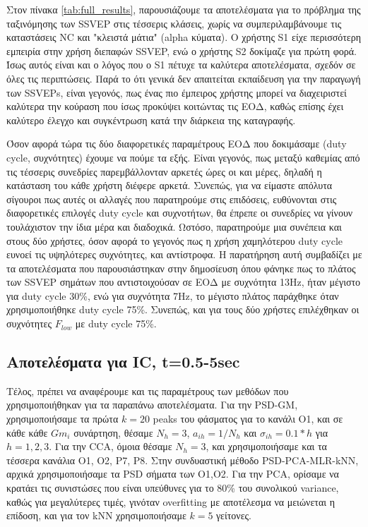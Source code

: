 \documentclass[11pt,a4paper,english,greek,twoside]{../Thesis}
\begin{document}
\par Στον πίνακα \ref{tab:full_results}, παρουσιάζουμε τα αποτελέσματα για το πρόβλημα της ταξινόμησης των SSVEP στις τέσσερις κλάσεις, χωρίς να συμπεριλαμβάνουμε τις καταστάσεις NC και "κλειστά μάτια" (alpha κύματα). Ο χρήστης S1 είχε περισσότερη εμπειρία στην χρήση διεπαφών SSVEP, ενώ ο χρήστης S2 δοκίμαζε για πρώτη φορά. Ίσως αυτός είναι και ο λόγος που ο S1 πέτυχε τα καλύτερα αποτελέσματα, σχεδόν σε όλες τις περιπτώσεις. Παρά το ότι γενικά δεν απαιτείται εκπαίδευση για την παραγωγή των SSVEPs, είναι γεγονός, πως ένας πιο έμπειρος χρήστης μπορεί να διαχειριστεί καλύτερα την κούραση που ίσως προκύψει κοιτώντας τις ΕΟΔ, καθώς επίσης έχει καλύτερο έλεγχο και συγκέντρωση κατά την διάρκεια της καταγραφής.
\par Όσον αφορά τώρα τις δύο διαφορετικές παραμέτρους ΕΟΔ που δοκιμάσαμε (duty cycle, συχνότητες) έχουμε να πούμε τα εξής. Είναι γεγονός, πως μεταξύ καθεμίας από τις τέσσερις συνεδρίες παρεμβάλλονταν αρκετές ώρες οι και μέρες, δηλαδή η κατάσταση του κάθε χρήστη διέφερε αρκετά. Συνεπώς, για να είμαστε απόλυτα σίγουροι πως αυτές οι αλλαγές που παρατηρούμε στις επιδόσεις, ευθύνονται στις διαφορετικές επιλογές duty cycle και συχνοτήτων, θα έπρεπε οι συνεδρίες να γίνουν τουλάχιστον την ίδια μέρα και διαδοχικά. Ωστόσο, παρατηρούμε μια συνέπεια και στους δύο χρήστες, όσον αφορά το γεγονός πως η χρήση χαμηλότερου duty cycle ευνοεί τις υψηλότερες συχνότητες, και αντίστροφα. Η παρατήρηση αυτή συμβαδίζει με τα αποτελέσματα που παρουσιάστηκαν στην δημοσίευση \cite{Huang2012-va} όπου φάνηκε πως το πλάτος των SSVEP σημάτων που αντιστοιχούσαν σε ΕΟΔ με συχνότητα 13Hz, ήταν μέγιστο για duty cycle 30\%, ενώ για συχνότητα 7Hz, το μέγιστο πλάτος παράχθηκε όταν χρησιμοποιήθηκε duty cycle 75\%. Συνεπώς, και για τους δύο χρήστες επιλέχθηκαν οι συχνότητες $F_{low}$ με duty cycle 75\%.
\subsection{Αποτελέσματα για IC,  t=0.5-5sec}
\par Τέλος, πρέπει να αναφέρουμε και τις παραμέτρους των μεθόδων που χρησιμοποιήθηκαν για τα παραπάνω αποτελέσματα. Για την PSD-GM, χρησιμοποιήσαμε τα πρώτα $k=20$ peaks του φάσματος για το κανάλι O1, και σε κάθε κάθε $Gm_i$ συνάρτηση, θέσαμε $N_h=3$, $a_{ih}=1/N_{h}$ και $\sigma_{ih}=0.1*h$ για $h=1,2,3$. Για την CCA, όμοια θέσαμε $N_h=3$, και χρησιμοποιήσαμε και τα τέσσερα κανάλια O1, O2, P7, P8. Στην συνδυαστική μέθοδο PSD-PCA-MLR-kNN, αρχικά χρησιμοποιήσαμε τα PSD σήματα των O1,O2. Για την PCA, ορίσαμε να κρατάει τις συνιστώσες που είναι υπεύθυνες για το 80\% του συνολικού variance, καθώς για μεγαλύτερες τιμές, γινόταν overfitting με αποτέλεσμα να μειώνεται η επίδοση, και για τον kNN χρησιμοποιήσαμε $k=5$ γείτονες.
\end{document}
